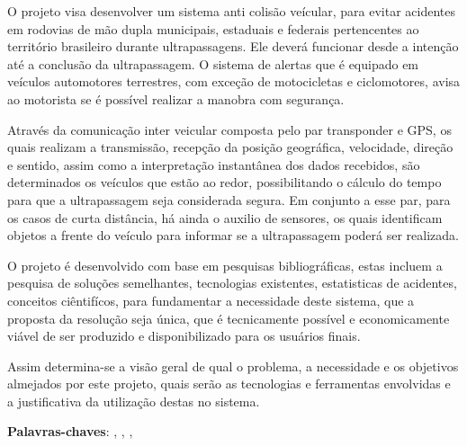 \begin{resumo}
  O projeto visa desenvolver um sistema anti colisão veícular, para evitar acidentes em rodovias de mão dupla
  municipais, estaduais e federais pertencentes ao território brasileiro durante ultrapassagens. Ele deverá
  funcionar desde a intenção até a conclusão da ultrapassagem. O sistema de alertas que é equipado em veículos automotores terrestres, com exceção de motocicletas e ciclomotores, avisa ao motorista se é possível realizar a manobra com segurança.

  Através da comunicação inter veicular composta pelo par transponder e GPS, os quais realizam a transmissão,
  recepção da posição geográfica, velocidade, direção e sentido, assim como a interpretação instantânea dos dados
  recebidos, são determinados os veículos que estão ao redor, possibilitando o cálculo do tempo para que a
ultrapassagem seja considerada segura. Em conjunto a esse par, para os casos de curta distância, há ainda o
auxilio de sensores, os quais identificam objetos a frente do veículo para informar se a ultrapassagem poderá
ser realizada.

  O projeto é desenvolvido com base em pesquisas bibliográficas, estas incluem a pesquisa de soluções semelhantes,
  tecnologias existentes, estatisticas de acidentes, conceitos ciêntifícos,  para fundamentar a necessidade deste
   sistema, que a proposta da resolução seja única, que é tecnicamente possível e economicamente viável de ser
   produzido e disponibilizado para os usuários finais.

  Assim determina-se a visão geral de qual o problema, a necessidade e os objetivos  almejados por este projeto,
  quais serão as tecnologias e ferramentas envolvidas e a justificativa da utilização destas no sistema. 

 \vspace{\onelineskip}

 \noindent
 \textbf{Palavras-chaves}: \imprimirpalavrachaveum, \imprimirpalavrachavedois, \imprimirpalavrachavetres, \imprimirpalavrachavequatro
\end{resumo}
